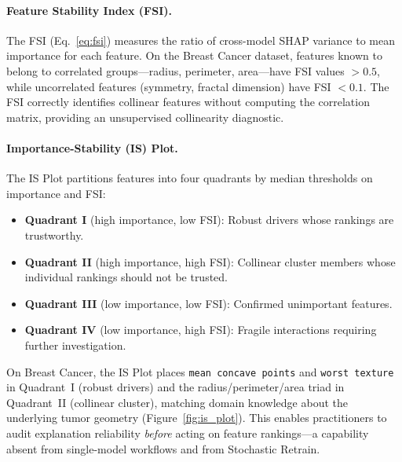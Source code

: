 \documentclass[11pt]{article}
\begin{document}
\paragraph{Feature Stability Index (FSI).}
The FSI (Eq.~\ref{eq:fsi}) measures the ratio of cross-model SHAP
variance to mean importance for each feature. On the Breast Cancer
dataset, features known to belong to correlated groups---radius,
perimeter, area---have FSI values $> 0.5$, while uncorrelated features
(symmetry, fractal dimension) have FSI $< 0.1$. The FSI correctly
identifies collinear features without computing the correlation matrix,
providing an unsupervised collinearity diagnostic.

\paragraph{Importance-Stability (IS) Plot.}
The IS Plot partitions features into four quadrants by median
thresholds on importance and FSI:
\begin{itemize}
  \item \textbf{Quadrant I} (high importance, low FSI): Robust
    drivers whose rankings are trustworthy.
  \item \textbf{Quadrant II} (high importance, high FSI): Collinear
    cluster members whose individual rankings should not be trusted.
  \item \textbf{Quadrant III} (low importance, low FSI): Confirmed
    unimportant features.
  \item \textbf{Quadrant IV} (low importance, high FSI): Fragile
    interactions requiring further investigation.
\end{itemize}

On Breast Cancer, the IS Plot places \texttt{mean concave points} and
\texttt{worst texture} in Quadrant~I (robust drivers) and the
radius/perimeter/area triad in Quadrant~II (collinear cluster), matching
domain knowledge about the underlying tumor geometry
(Figure~\ref{fig:is_plot}). This enables practitioners to audit
explanation reliability \emph{before} acting on feature rankings---a
capability absent from single-model workflows and from Stochastic
Retrain.
\end{document}

